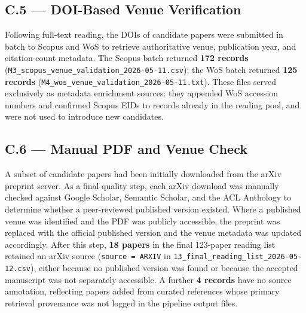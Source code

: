 \subsection*{C.5 — DOI-Based Venue Verification}
\label{app:search_log:doi}

Following full-text reading, the DOIs of candidate papers were submitted in batch to
Scopus and WoS to retrieve authoritative venue, publication year, and citation-count
metadata. The Scopus batch returned \textbf{172 records}
(\texttt{M3\_scopus\_venue\_validation\_2026-05-11.csv}); the WoS batch returned
\textbf{125 records} (\texttt{M4\_wos\_venue\_validation\_2026-05-11.txt}). These
files served exclusively as metadata enrichment sources: they appended WoS accession
numbers and confirmed Scopus EIDs to records already in the reading pool, and were not
used to introduce new candidates.

\subsection*{C.6 — Manual PDF and Venue Check}
\label{app:search_log:pdf}

A subset of candidate papers had been initially downloaded from the arXiv preprint
server. As a final quality step, each arXiv download was manually checked against
Google Scholar, Semantic Scholar, and the ACL Anthology to determine whether a
peer-reviewed published version existed. Where a published venue was identified and
the PDF was publicly accessible, the preprint was replaced with the official published
version and the venue metadata was updated accordingly. After this step,
\textbf{18 papers} in the final 123-paper reading list retained an arXiv source
(\texttt{source = ARXIV} in \texttt{13\_final\_reading\_list\_2026-05-12.csv}),
either because no published version was found or because the accepted manuscript was
not separately accessible. A further \textbf{4 records} have no source annotation,
reflecting papers added from curated references whose primary retrieval provenance was
not logged in the pipeline output files.
